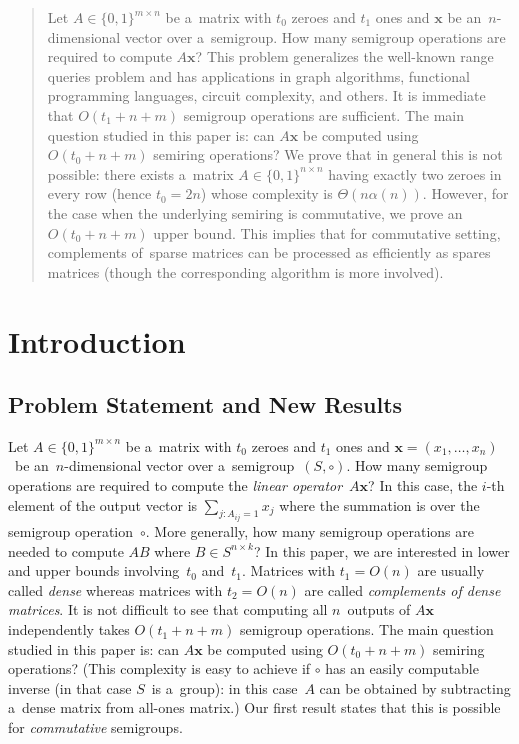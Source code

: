 \documentclass[11pt,letterpaper]{article}
\begin{document}
\begin{abstract}
Let $A \in \{0,1\}^{m \times n}$ be a~matrix with $t_0$ zeroes
and $t_1$ ones and $\mathbf{x}$ be an~$n$-dimensional vector 
over a~semigroup. How many semigroup operations are required to 
compute $A\mathbf{x}$? This problem generalizes the well-known 
range queries problem and has applications in graph algorithms, 
functional programming languages, circuit complexity, and others. It 
is immediate that $O(t_1+n+m)$ semigroup operations are 
sufficient. The main question studied in this paper is: 
can $A\mathbf{x}$ be computed using $O(t_0+n+m)$ semiring 
operations? We prove that in general this is not possible: there 
exists a~matrix $A \in \{0,1\}^{n \times n}$ having exactly two 
zeroes in every row (hence $t_0=2n$) whose complexity is 
$\Theta(n\alpha(n))$. However, for the case when the underlying 
semiring is commutative, we prove an~$O(t_0+n+m)$ upper 
bound. This implies that for commutative setting, complements 
of~sparse matrices can be processed as efficiently as spares
matrices (though the corresponding algorithm is more involved).
\end{abstract}

\thispagestyle{empty}

\tableofcontents





\section{Introduction}
\subsection{Problem Statement and New Results}
Let $A \in \{0,1\}^{m \times n}$ be a~matrix with $t_0$ zeroes
and $t_1$ ones and 
$\mathbf{x}=(x_1, \dotsc, x_n)$~be an~$n$-dimensional vector 
over a~semigroup~$(S, \circ)$. 
How many semigroup operations are required to 
compute the \emph{linear operator}~$A\mathbf{x}$?
In this case, the $i$-th element of the output vector is
$\sum_{j \colon A_{ij}=1}x_j$ where the summation 
is over the semigroup operation~$\circ$.
More generally, how many semigroup operations are needed 
to compute $AB$ where $B \in S^{n \times k}$?
In this paper, 
we are interested in lower and upper bounds 
involving~$t_0$ and~$t_1$. 
Matrices with $t_1=O(n)$ are usually called \emph{dense} 
whereas matrices with $t_2=O(n)$ 
are called \emph{complements of dense matrices}. 
It is not difficult to see that computing all $n$~outputs
of $A\mathbf{x}$ independently takes
$O(t_1+n+m)$ semigroup operations.
The main question studied in this paper is: 
can $A\mathbf{x}$ be computed using $O(t_0+n+m)$ semiring 
operations? (This complexity is easy to achieve if $\circ$ has an
easily computable inverse (in that case $S$~is a~group): in this case~$A$ can be obtained by subtracting a~dense matrix from all-ones matrix.) Our first result states that this is possible for 
\emph{commutative} semigroups.
\end{document}
